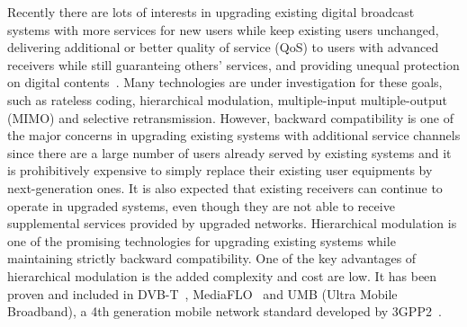 \documentclass[10pt,fleqn, twocolumn]{IEEEtran}
\begin{document}
Recently there are lots of interests in upgrading existing digital
broadcast systems with more services for new users while keep
existing users unchanged, delivering  additional or better quality
of service (QoS) to users with advanced receivers while still
guaranteing others' services, and providing unequal protection on
digital contents~\cite{DVB,MediaFLO,Jiang05,Ghandi06,UMB}. Many
technologies are under investigation for these goals, such as
rateless coding, hierarchical modulation, multiple-input
multiple-output (MIMO) and selective retransmission. However,
backward compatibility is one of the major concerns in upgrading
existing systems with additional service channels since there are
a large number of users already served by existing systems and it
is prohibitively expensive to simply replace their existing user
equipments by next-generation ones. It is also expected that
existing receivers can continue to operate in upgraded systems,
even though they are not able to receive supplemental services
provided by upgraded networks. Hierarchical modulation is one of
the promising technologies for upgrading existing systems while
maintaining strictly backward compatibility. One of the key
advantages of hierarchical modulation is the added complexity and
cost are low. It has been proven and included in DVB-T~\cite{DVB},
MediaFLO~\cite{MediaFLO} and UMB (Ultra Mobile Broadband), a 4th
generation mobile network standard developed by 3GPP2~\cite{UMB}.
\end{document}
